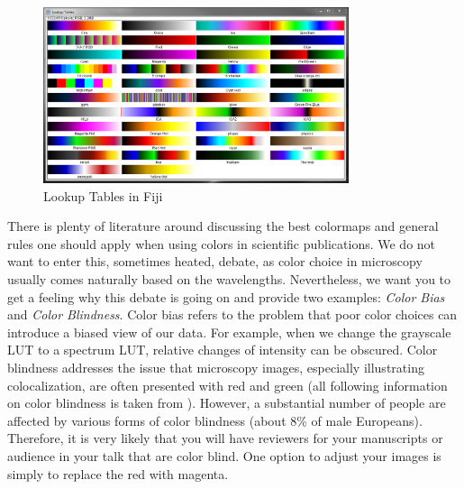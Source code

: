 \begin{figure}[!ht]
	\centering
		\includegraphics[width=0.80\textwidth]{mod1/figures/lookup-tables.png}
	\caption{Lookup Tables in Fiji}
	\label{fig:lookup-tables}
\end{figure}

There is plenty of literature around discussing the best colormaps and general rules one should apply when using colors in scientific publications. We do not want to enter this, sometimes heated, debate, as color choice in microscopy usually comes naturally based on the wavelengths. Nevertheless, we want you to get a feeling why this debate is going on and provide two examples: \emph{Color Bias} and \emph{Color Blindness}. Color bias refers to the problem that poor color choices can introduce a biased view of our data. For example, when we change the grayscale LUT to a spectrum LUT, relative changes of intensity can be obscured. Color blindness addresses the issue that microscopy images, especially illustrating colocalization, are often presented with red and green (all following information on color blindness is taken from \cite{wong2011}). However, a substantial number of people are affected by various forms of color blindness (about 8\% of male Europeans). Therefore, it is very likely that you will have reviewers for your manuscripts or audience in your talk that are color blind. One option to adjust your images is simply to replace the red with magenta.


